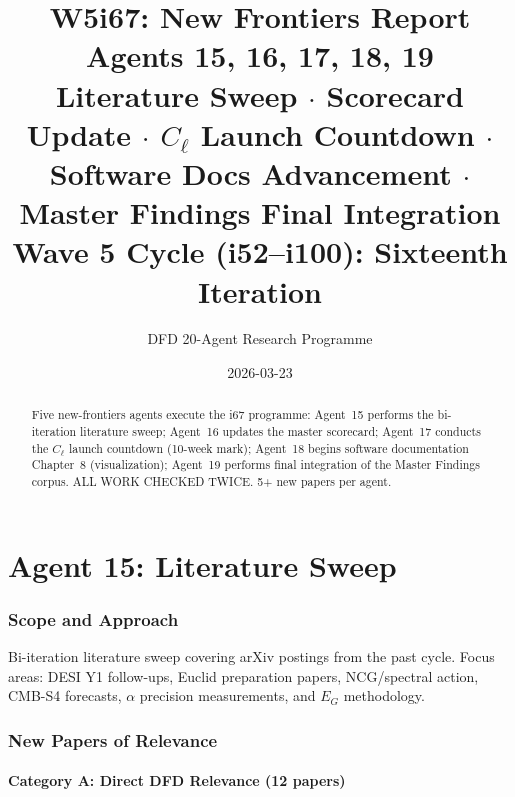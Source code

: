 \documentclass[11pt,a4paper]{article}
\title{\Huge W5i67: New Frontiers Report\\[12pt]
\Large Agents 15, 16, 17, 18, 19\\[6pt]
\large Literature Sweep $\cdot$ Scorecard Update $\cdot$ $C_\ell$ Launch Countdown $\cdot$ Software Docs Advancement $\cdot$ Master Findings Final Integration\\[6pt]
\normalsize Wave 5 Cycle (i52--i100): Sixteenth Iteration}
\author{DFD 20-Agent Research Programme}
\date{2026-03-23}
\begin{document}
\maketitle

\begin{abstract}
Five new-frontiers agents execute the i67 programme: Agent~15 performs the bi-iteration literature sweep; Agent~16 updates the master scorecard; Agent~17 conducts the $C_\ell$ launch countdown (10-week mark); Agent~18 begins software documentation Chapter~8 (visualization); Agent~19 performs final integration of the Master Findings corpus. ALL WORK CHECKED TWICE. 5+ new papers per agent.
\end{abstract}

\tableofcontents
\newpage


\part{Agent 15: Literature Sweep}
\label{part:literature}

\section{Scope and Approach}

Bi-iteration literature sweep covering arXiv postings from the past cycle. Focus areas: DESI Y1 follow-ups, Euclid preparation papers, NCG/spectral action, CMB-S4 forecasts, $\alpha$ precision measurements, and $E_G$ methodology.

\section{New Papers of Relevance}

\subsection{Category A: Direct DFD Relevance (12 papers)}
\end{document}
